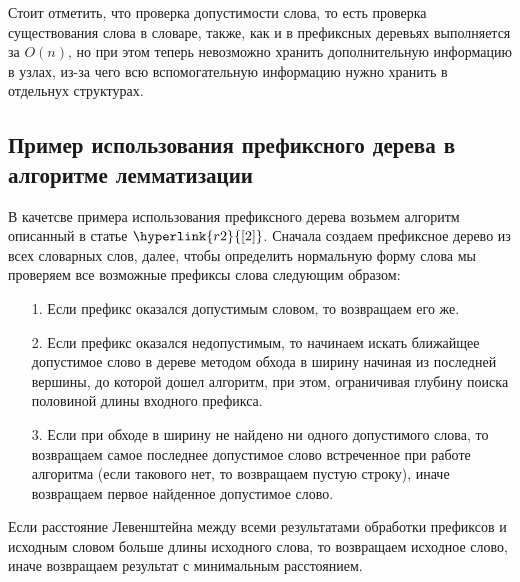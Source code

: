 \documentclass[12pt, a4paper]{article}
\begin{document}
\begin{figure}[htp]
\label{ris:MinDAFSA.png}
\end{figure}

Стоит отметить, что проверка допустимости слова, то есть проверка существования слова в словаре, также, как и в префиксных деревьях выполняется за $O(n)$, но при этом теперь невозможно хранить дополнительную информацию в узлах, из-за чего всю вспомогательную информацию нужно хранить в отдельнух структурах.

\subsection{Пример использования префиксного дерева в алгоритме лемматизации}
\quad В качетсве примера использования префиксного дерева возьмем алгоритм описанный в статье $\hyperlink{r2}{[2]}$. Сначала создаем префиксное дерево из всех словарных слов, далее, чтобы определить нормальную форму слова мы проверяем все возможные префиксы слова следующим образом: 

\begin{enumerate}
\item[1.] Если префикс оказался допустимым словом, то возвращаем его же.
\item[2.] Если префикс оказался недопустимым, то начинаем искать ближайщее допустимое слово в дереве методом обхода в ширину начиная из последней вершины, до которой дошел алгоритм, при этом, ограничивая глубину поиска половиной длины входного префикса.
\item[3.] Если при обходе в ширину не найдено ни одного допустимого слова, то возвращаем самое последнее допустимое слово встреченное при работе алгоритма (если такового нет, то возвращаем пустую строку), иначе возвращаем первое найденное допустимое слово.
\end{enumerate}

\begin{figure}[htp]
\label{ris:Prefix_diag.png}
\end{figure}

Если расстояние Левенштейна между всеми результатами обработки префиксов и исходным словом больше длины исходного слова, то возвращаем исходное слово, иначе возвращаем результат с минимальным расстоянием.
\end{document}
